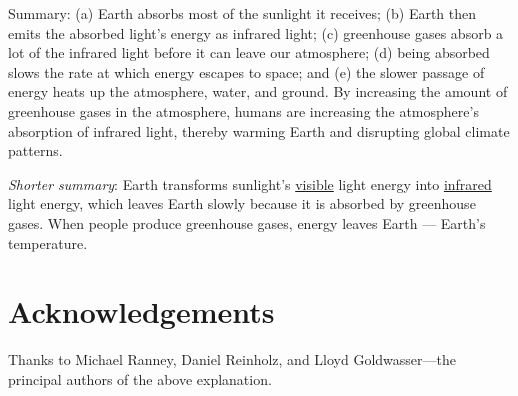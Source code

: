 Summary: (a) Earth absorbs most of the sunlight it receives; (b) Earth then
emits the absorbed light's energy as infrared light; (c) greenhouse gases absorb
a lot of the infrared light before it can leave our atmosphere; (d) being
absorbed slows the rate at which energy escapes to space; and (e) the slower
passage of energy heats up the atmosphere, water, and ground. By increasing the
amount of greenhouse gases in the atmosphere, humans are increasing the
atmosphere's absorption of infrared light, thereby warming Earth and disrupting
global climate patterns.

\emph{Shorter summary}: Earth transforms sunlight's \underline{visible} light
energy into \underline{infrared} light energy, which leaves Earth slowly because
it is absorbed by greenhouse gases. When people produce greenhouse gases, energy
leaves Earth \underline{}---\underline{} Earth's temperature.

\section*{Acknowledgements}

Thanks to Michael Ranney, Daniel Reinholz, and Lloyd Goldwasser---the principal
authors of the above explanation.

